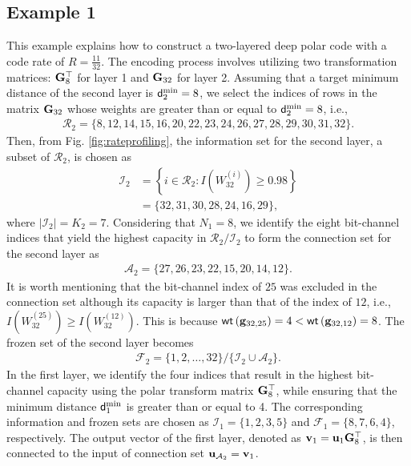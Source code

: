 \documentclass[conference]{IEEEtran}
\begin{document}
\subsection{Example 1}
 

This example explains how to construct a two-layered deep polar code with a code rate of $R=\frac{11}{32}$. The encoding process involves utilizing two transformation matrices: ${\bf G}_{8}^{\top}$ for layer 1 and ${\bf G}_{32}$ for layer 2.  Assuming that a target minimum distance of the second layer is ${\sf d}^{\rm min}_{2}=8$, we select the indices of rows in the matrix ${\bf G}_{32}$ whose weights are greater than or equal to ${\sf d}^{\rm min}_{2}=8$, i.e.,
 \begin{align}
	\mathcal{R}_{2}=\{8,12,14,15,16,20,22,23,24,26,27,28,29,30,31,32\}.\nonumber
\end{align}
Then, from Fig. \ref{fig:rateprofiling}, the information set for the second layer, a subset of $\mathcal{R}_{2}$, is chosen as
\begin{align}
	\mathcal{I}_2&=\left\{i\in \mathcal{R}_2: I\left(W_{32}^{(i)}\right) \geq 0.98 \right\}\nonumber\\
	& =\{32,31,30,28,24,16,29\},\nonumber
\end{align}
where $|\mathcal{I}_2|=K_2=7$.  Considering that $N_1=8$, we identify the eight bit-channel indices that yield the highest capacity in $\mathcal{R}_2/\mathcal{I}_2$ to form the connection set for the second layer as
  \begin{align}
	\mathcal{A}_2 =\{ 27,26,23,22,15,20,14,12\}.\nonumber
\end{align}
It is worth mentioning that the bit-channel index of $25$ was excluded in the connection set although its capacity is larger than that of the index of $12$, i.e.,  $I\left(W_{32}^{(25)}\right) \geq I\left(W_{32}^{(12)}\right)$. This is because ${\sf wt}\left({\bf g}_{32,25} \right)=4<{\sf wt}\left({\bf g}_{32,12} \right)=8$. The frozen set of the second layer becomes
\begin{align}
	\mathcal{F}_2=\{1,2,\ldots, 32\}/\{\mathcal{I}_2\cup\mathcal{A}_2\}.\nonumber
\end{align}
In the first layer, we identify the four indices that result in the highest bit-channel capacity using the polar transform matrix ${\bf G}_8^{\top}$, while ensuring that the minimum distance ${\sf d}^{\rm min}_1$ is greater than or equal to 4. The corresponding information and frozen sets are chosen as $\mathcal{I}_1=\{1,2,3,5\}$ and $\mathcal{F}_1=\{8,7,6,4\}$, respectively. The output vector of the first layer, denoted as ${\bf v}_1={\bf u}_{1}{\bf G}_8^{\top}$, is then connected to the input of connection set ${\bf u}_{\mathcal{A}_2}={\bf v}_1$.
\end{document}
